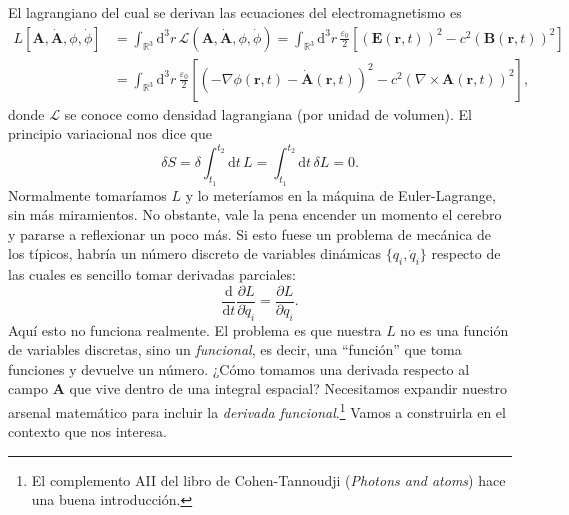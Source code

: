 El lagrangiano del cual se derivan las ecuaciones del electromagnetismo es
\begin{align}
    \nonumber
    L[\mathbf{A}, \dot{\mathbf{A}}, \phi, \dot{\phi}] &= \int_{\mathbb{R}^3}\mathrm{d}^3r\, \mathcal{L}(\mathbf{A}, \dot{\mathbf{A}}, \phi, \dot{\phi}) = \int_{\mathbb{R}^3}\mathrm{d}^3r\, \frac{\varepsilon_0}{2} \left[\left(\mathbf{E}(\mathbf{r}, t)\right)^2 - c^2 \left(\mathbf{B}(\mathbf{r}, t)\right)^2\right]\\
    \label{eq.1-EM_lagrangian}
    &= \int_{\mathbb{R}^3}\mathrm{d}^3r\, \frac{\varepsilon_0}{2} \left[\left(-\nabla\phi(\mathbf{r}, t)- \dot{\mathbf{A}}(\mathbf{r}, t)\right)^2 - c^2 (\nabla\times\mathbf{A}(\mathbf{r}, t))^2\right],
\end{align}
donde \(\mathcal{L}\) se conoce como densidad lagrangiana (por unidad de volumen). El principio variacional nos dice que 
\begin{equation}
    \label{eq.1-principio_variacional}
    \delta S = \delta \int_{t_1}^{t_2}\mathrm{d}t\, L = \int_{t_1}^{t_2}\mathrm{d}t\, \delta L = 0.
\end{equation}
Normalmente tomaríamos \(L\) y lo meteríamos en la máquina de Euler-Lagrange, sin más miramientos. No obstante, vale la pena encender un momento el cerebro y pararse a reflexionar un poco más. Si esto fuese un problema de mecánica de los típicos, habría un número discreto de variables dinámicas \(\{q_i, \dot{q}_i\}\) respecto de las cuales es sencillo tomar derivadas parciales:
\begin{equation}
    \frac{\mathrm{d}}{\mathrm{d}t}\frac{\partial L}{\partial \dot{q}_i} = \frac{\partial L}{\partial q_i}.
\end{equation}
Aquí esto no funciona realmente. El problema es que nuestra \(L\) no es una función de variables discretas, sino un \emph{funcional}, es decir, una ``función'' que toma funciones y devuelve un número. ¿Cómo tomamos una derivada respecto al campo \(\mathbf{A}\) que vive dentro de una integral espacial? Necesitamos expandir nuestro arsenal matemático para incluir la \emph{derivada funcional}.\footnote{El complemento AII del libro de Cohen-Tannoudji (\textit{Photons and atoms}) hace una buena introducción.} Vamos a construirla en el contexto que nos interesa.

